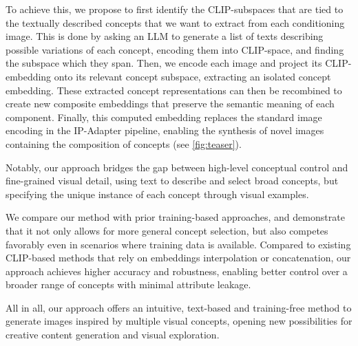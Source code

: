 To achieve this, we propose to first identify the CLIP-subspaces that are tied to the textually described concepts that we want to extract from each conditioning image. This is done by asking an LLM to generate a list of texts describing possible variations of each concept, encoding them into CLIP-space, and finding the subspace which they span. Then, we encode each image and project its CLIP-embedding onto its relevant concept subspace, extracting an isolated concept embedding. These extracted concept representations can then be recombined to create new composite embeddings that preserve the semantic meaning of each component. Finally, this computed embedding replaces the standard image encoding in the IP-Adapter pipeline, enabling the synthesis of novel images containing the composition of concepts (see \cref{fig:teaser}). 

Notably, our approach bridges the gap between high-level conceptual control and fine-grained visual detail, using text to describe and select broad concepts, but specifying the unique instance of each concept through visual examples.

We compare our method with prior training-based approaches, and demonstrate that it not only allows for more general concept selection, but also competes favorably even in scenarios where training data is available. Compared to existing CLIP-based methods that rely on embeddings interpolation or concatenation, our approach achieves higher accuracy and robustness, enabling better control over a broader range of concepts with minimal attribute leakage.

All in all, our approach offers an intuitive, text-based and training-free method to generate images inspired by multiple visual concepts, opening new possibilities for creative content generation and visual exploration. 





